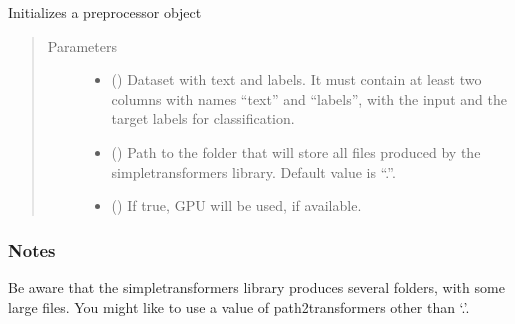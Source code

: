 \documentclass[letterpaper,10pt,english]{sphinxmanual}
\begin{document}
\begin{fulllineitems}
\begin{fulllineitems}
\label{\detokenize{dc_classifier:src.domain_classifier.classifier.CorpusClassifier.__init__}}
\sphinxAtStartPar
Initializes a preprocessor object
\begin{quote}\begin{description}
\item[{Parameters}] \leavevmode\begin{itemize}
\item {} 
\sphinxAtStartPar
{} () \textendash{} Dataset with text and labels. It must contain at least two columns
with names “text” and “labels”, with the input and the target
labels for classification.

\item {} 
\sphinxAtStartPar
{} () \textendash{} Path to the folder that will store all files produced by the
simpletransformers library.
Default value is “.”.

\item {} 
\sphinxAtStartPar
{} () \textendash{} If true, GPU will be used, if available.

\end{itemize}

\end{description}\end{quote}
\subsubsection*{Notes}

\sphinxAtStartPar
Be aware that the simpletransformers library produces several folders,
with some large files. You might like to use a value of
path2transformers other than ‘.’.

\end{fulllineitems}



\end{fulllineitems}
\end{document}
